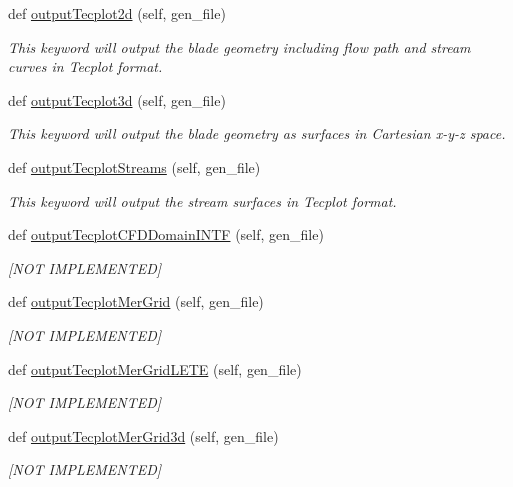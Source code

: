 \begin{DoxyCompactItemize}
def \hyperlink{a00070_a63d4bad24ed0fab617c1676db04a67e7}{output\+Tecplot2d} (self, gen\+\_\+file)
\begin{DoxyCompactList}\small\item\em This keyword will output the blade geometry including flow path and stream curves in Tecplot format. \end{DoxyCompactList}\item 
def \hyperlink{a00070_a33919a9fe9364387c8f96fa21c35d2e8}{output\+Tecplot3d} (self, gen\+\_\+file)
\begin{DoxyCompactList}\small\item\em This keyword will output the blade geometry as surfaces in Cartesian x-\/y-\/z space. \end{DoxyCompactList}\item 
def \hyperlink{a00070_adb8d68c4190d41bd93a2988562f6495b}{output\+Tecplot\+Streams} (self, gen\+\_\+file)
\begin{DoxyCompactList}\small\item\em This keyword will output the stream surfaces in Tecplot format. \end{DoxyCompactList}\item 
def \hyperlink{a00070_ab3fe3d49e2e140068cb5b3b25964919f}{output\+Tecplot\+C\+F\+D\+Domain\+I\+N\+TF} (self, gen\+\_\+file)
\begin{DoxyCompactList}\small\item\em \mbox{[}N\+OT I\+M\+P\+L\+E\+M\+E\+N\+T\+ED\mbox{]} \end{DoxyCompactList}\item 
def \hyperlink{a00070_a735d8bff1d58f17130859af0f97dfbd7}{output\+Tecplot\+Mer\+Grid} (self, gen\+\_\+file)
\begin{DoxyCompactList}\small\item\em \mbox{[}N\+OT I\+M\+P\+L\+E\+M\+E\+N\+T\+ED\mbox{]} \end{DoxyCompactList}\item 
def \hyperlink{a00070_a504ccb848106dd7a0a4148941e2ec6d9}{output\+Tecplot\+Mer\+Grid\+L\+E\+TE} (self, gen\+\_\+file)
\begin{DoxyCompactList}\small\item\em \mbox{[}N\+OT I\+M\+P\+L\+E\+M\+E\+N\+T\+ED\mbox{]} \end{DoxyCompactList}\item 
def \hyperlink{a00070_a4ea4c17b862c49ad9c51398fa9d60dbc}{output\+Tecplot\+Mer\+Grid3d} (self, gen\+\_\+file)
\begin{DoxyCompactList}\small\item\em \mbox{[}N\+OT I\+M\+P\+L\+E\+M\+E\+N\+T\+ED\mbox{]} \end{DoxyCompactList}\item 

\end{DoxyCompactItemize}
